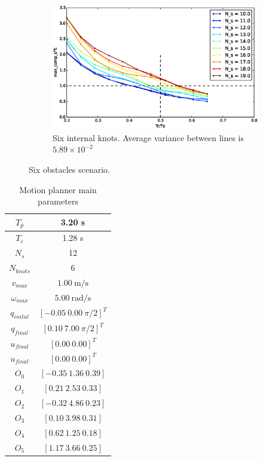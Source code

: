 \begin{figure}
        ~ %
        \begin{subfigure}[b]{0.48\textwidth}
                \includegraphics[width=\textwidth]{./img/realtime/Scenario_6__N_knots_6/mcttc-tctp.eps}
                \caption{Six internal knots.  Average variance between lines is $5.89\times 10^{-2}$}\label{fig:uni66}
        \end{subfigure}
        \caption{Six obstacles scenario.}\label{fig:uni6}
\end{figure}
\begin{table}[!h]
\caption {Motion planner main parameters} \label{tab:s3param}


\begin{center}
\begin{tabular}{|c|c|}
\hline
$T_p$ & 3.20 s\\
\hline 
$T_c$ & 1.28 s\\
\hline 
$N_s$ & 12\\
\hline 
$N_{knots}$ & 6\\
\hline
$v_{max}$ & $1.00\ \mathrm{m/s}$\\
\hline
$\omega_{max}$ & $5.00\ \mathrm{rad/s}$\\
\hline
$q_{inital}$ & $[-0.05\ 0.00\ \pi/2]^T$\\
\hline
$q_{final}$ & $[0.10\ 7.00\ \pi/2]^T$\\
\hline
$u_{final}$ & $[0.00\ 0.00]^T$\\
\hline
$u_{final}$ & $[0.00\ 0.00]^T$\\
\hline
$O_0$ & $[-0.35\ 1.36\ 0.39]$\\
\hline
$O_1$ & $[0.21\ 2.53\ 0.33]$\\
\hline
$O_2$ & $[-0.32\ 4.86\ 0.23]$\\
\hline
$O_3$ & $[0.10\ 3.98\ 0.31]$\\
\hline
$O_4$ & $[0.62\ 1.25\ 0.18]$\\
\hline
$O_5$ & $[1.17\ 3.66\ 0.25]$\\
\hline
\end{tabular}
\end{center}
\end{table}

